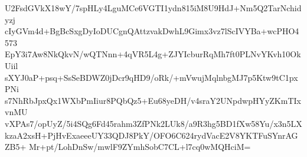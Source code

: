 U2FsdGVkX18wY/7spHLy4LguMCe6VGTI1ydn815iM8U9HdJ+Nm5Q2TarNchidyzj
cIyGVm4d+BgBcSxgDyIoDUCgnQAttzvakDwhL9Gimx3vz7lScIVYBa+wcPHO4573
EpY3i7Aw8NkQkvN/wQTNnn+4qVR5L4g+ZJYIcburRqMh7ft0PLNvYKvh10OkUiil
sXYJ0aP+psq+SsSeBDWZ0jDcr9qHD9/oRk/+mVwujMqlnbgMJ7p5Ktw9tC1pxPNi
s7NhRbJpxQx1WXbPmIiur8PQbQz5+Eu68yeDH/v4sraY2UNpdwpHYyZKmTIxvnMU
vXPAs7/opUyZ/5i4SQg6Fd45rahm3ZfPNk2LUk8/a9R3hg5BD1fXw58Yu/x3n5LX
kzaA2xsH+PjHvExaeeeUY33QDJ8PkY/OFO6C624rydVacE2V8YKTFuSYnrAGZB5+
Mr+pt/LohDnSw/mwlF9ZYmhSobC7CL+l7cq0wMQHciM=
